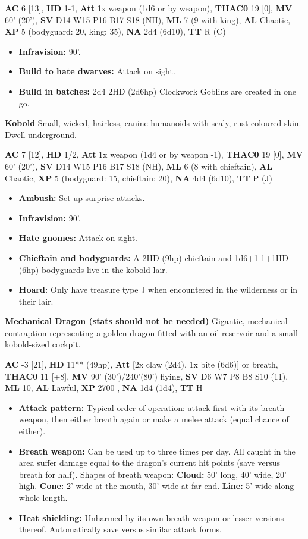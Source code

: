 \documentclass[letterpaper,sansserif,tightsqueeze]{rpg-module}
\begin{document}
\textbf{AC} 6 [13], \textbf{HD} 1-1, \textbf{Att} 1x weapon (1d6 or by weapon), \textbf{THAC0} 19 [0], \textbf{MV} 60' (20'), \textbf{SV} D14 W15 P16 B17 S18 (NH), \textbf{ML} 7 (9 with king), \textbf{AL} Chaotic, \textbf{XP} 5 (bodyguard: 20, king: 35), \textbf{NA} 2d4 (6d10), \textbf{TT} R (C)
\begin{itemize}
	\item \textbf{Infravision:} 90'.
	\item \textbf{Build to hate dwarves:} Attack on sight.
	\item \textbf{Build in batches:} 2d4 2HD (2d6hp) Clockwork Goblins are created in one go.
\end{itemize}


\textbf{Kobold}
Small, wicked, hairless, canine humanoids with scaly, rust-coloured skin. Dwell underground.

\textbf{AC} 7 [12], \textbf{HD} 1/2, \textbf{Att} 1x weapon (1d4 or by weapon -1), \textbf{THAC0} 19 [0], \textbf{MV} 60' (20'), \textbf{SV} D14 W15 P16 B17 S18 (NH), \textbf{ML} 6 (8 with chieftain), \textbf{AL} Chaotic, \textbf{XP} 5 (bodyguard: 15, chieftain: 20), \textbf{NA} 4d4 (6d10), \textbf{TT} P (J)
\begin{itemize}
	\item \textbf{Ambush:} Set up surprise attacks.
	\item \textbf{Infravision:} 90'.
	\item \textbf{Hate gnomes:} Attack on sight.
	\item \textbf{Chieftain and bodyguards:} A 2HD (9hp) chieftain and 1d6+1 1+1HD (6hp) bodyguards live in the kobold lair.
	\item \textbf{Hoard:} Only have treasure type J when encountered in the wilderness or in their lair.
\end{itemize}


\textbf{Mechanical Dragon (stats should not be needed)}
Gigantic, mechanical contraption representing a golden dragon fitted with an oil reservoir and a small kobold-sized cockpit.

\textbf{AC} -3 [21], \textbf{HD} 11** (49hp), \textbf{Att} [2x claw (2d4), 1x bite (6d6)] or breath, \textbf{THAC0} 11 [+8], \textbf{MV} 90' (30')/240'(80') flying, \textbf{SV} D6 W7 P8 B8 S10 (11), \textbf{ML} 10, \textbf{AL} Lawful, \textbf{XP} 2700 , \textbf{NA} 1d4 (1d4), \textbf{TT} H
\begin{itemize}
	\item \textbf{Attack pattern:} Typical order of operation: attack first with its breath weapon, then either breath again or make a melee attack (equal chance of either).
	\item \textbf{Breath weapon:} Can be used up to three times per day. All caught in the area suffer damage equal to the dragon’s current hit points (save versus breath for half). Shapes of breath weapon:
		\subitem \textbf{Cloud:} 50' long, 40' wide, 20' high.
		\subitem \textbf{Cone:} 2' wide at the mouth, 30’ wide at far end.
		\subitem \textbf{Line:} 5' wide along whole length.
	\item \textbf{Heat shielding:} Unharmed by its own breath weapon or lesser versions thereof. Automatically save versus similar attack forms.
\end{itemize}
\end{document}
